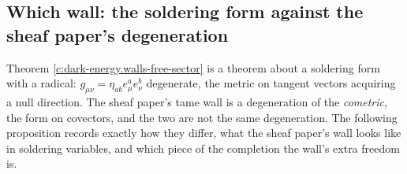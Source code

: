 \documentclass[11pt]{article}
\theoremstyle{definition}
\theoremstyle{plain}
\begin{document}
\subsection*{Which wall: the soldering form against the sheaf paper's degeneration}
\label{c:note.dark-energy.setting-which-wall-soldering-form-against}
Theorem \ref{c:dark-energy.walls-free-sector} is a theorem about a soldering form with a radical: $g_{\mu\nu} = \eta_{ab}e^a_\mu e^b_\nu$ degenerate, the metric on tangent vectors acquiring a null direction. The sheaf paper's tame wall is a degeneration of the \emph{cometric}, the form on covectors, and the two are not the same degeneration. The following proposition records exactly how they differ, what the sheaf paper's wall looks like in soldering variables, and which piece of the completion the wall's extra freedom is.
\end{document}
